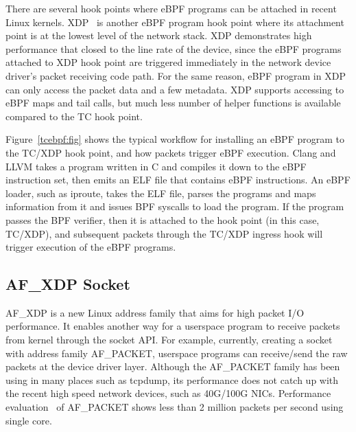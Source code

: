 \documentclass[10pt,numbers,reprint]{sigplanconf}
\begin{document}
There are several hook points where eBPF programs can be attached in recent
Linux kernels. XDP~\cite{xdp,xdp2,xdp-conext18} is another eBPF program hook point where
its attachment point is at the lowest level of the network stack.
XDP demonstrates high performance that closed to the line rate of the device,
since the eBPF programs attached to XDP hook point are triggered immediately
in the network device driver's packet receiving code path. For the same reason,
eBPF program in XDP can only access the packet data and a few metadata.
XDP supports accessing to eBPF maps and tail calls, but much less number of
helper functions is available compared to the TC hook point.

Figure~\ref{tcebpf:fig}
shows the typical workflow for installing an eBPF program to the TC/XDP hook point,
and how packets trigger eBPF execution.  Clang and LLVM takes a program
written in C and compiles it down to the eBPF instruction set, then emits an
ELF file that contains eBPF instructions.  An eBPF loader, such as iproute,
takes the ELF file, parses the programs and maps information from it and
issues BPF syscalls to load the program.  If the program passes the BPF verifier,
then it is attached to the hook point (in this case, TC/XDP), and
subsequent packets through the TC/XDP ingress hook will trigger execution of the
eBPF programs.

\subsection{AF\_XDP Socket}
AF\_XDP is a new Linux address family that aims for high packet I/O
performance. It enables another way for a userspace program to receive
packets from kernel through the socket API. For example, currently, creating
a socket with address family AF\_PACKET, userspace programs can receive/send
the raw packets
at the device driver layer.  Although the AF\_PACKET family has been using
in many places such as tcpdump, its performance does not catch up with the
recent high speed network devices, such as 40G/100G NICs.
Performance evaluation~\cite{af_packet_v4} of AF\_PACKET
shows less than 2 million packets per second using single core.
\end{document}
